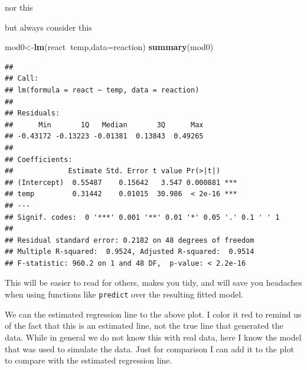 \documentclass[
]{book}
\newenvironment{Shaded}{\begin{snugshade}}{\end{snugshade}}
\newcommand{\DataTypeTok}[1]{\textcolor[rgb]{0.13,0.29,0.53}{#1}}
\newcommand{\KeywordTok}[1]{\textcolor[rgb]{0.13,0.29,0.53}{\textbf{#1}}}
\newcommand{\NormalTok}[1]{#1}
\newcommand{\OperatorTok}[1]{\textcolor[rgb]{0.81,0.36,0.00}{\textbf{#1}}}
\begin{document}
nor this

\begin{Shaded}
\end{Shaded}

but always consider this

\begin{Shaded}
\begin{Highlighting}[]
\NormalTok{mod0<-}\KeywordTok{lm}\NormalTok{(react}\OperatorTok{~}\NormalTok{temp,}\DataTypeTok{data=}\NormalTok{reaction)}
\KeywordTok{summary}\NormalTok{(mod0)}
\end{Highlighting}
\end{Shaded}

\begin{verbatim}
## 
## Call:
## lm(formula = react ~ temp, data = reaction)
## 
## Residuals:
##      Min       1Q   Median       3Q      Max 
## -0.43172 -0.13223 -0.01381  0.13843  0.49265 
## 
## Coefficients:
##             Estimate Std. Error t value Pr(>|t|)    
## (Intercept)  0.55487    0.15642   3.547 0.000881 ***
## temp         0.31442    0.01015  30.986  < 2e-16 ***
## ---
## Signif. codes:  0 '***' 0.001 '**' 0.01 '*' 0.05 '.' 0.1 ' ' 1
## 
## Residual standard error: 0.2182 on 48 degrees of freedom
## Multiple R-squared:  0.9524,	Adjusted R-squared:  0.9514 
## F-statistic: 960.2 on 1 and 48 DF,  p-value: < 2.2e-16
\end{verbatim}

This will be easier to read for others, makes you tidy, and will save you headaches when using functions like \texttt{predict} over the resulting fitted model.

We can the estimated regression line to the above plot. I color it red to remind us of the fact that this is an estimated line, not the true line that generated the data. While in general we do not know this with real data, here I know the model that was used to simulate the data. Just for comparison I can add it to the plot to compare with the estimated regression line.
\end{document}
